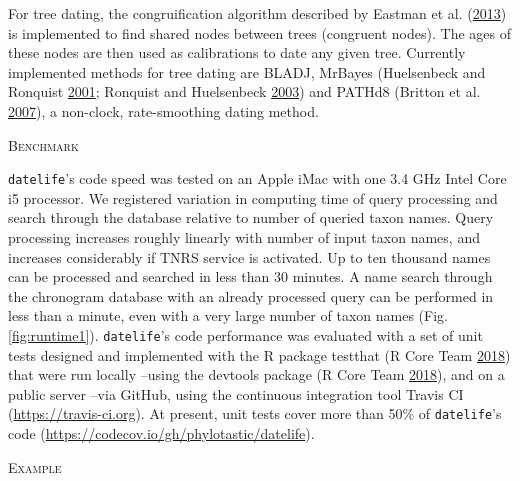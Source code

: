 \documentclass[]{article}
\begin{document}
For tree dating, the congruification algorithm described by Eastman et al. (\protect\hyperlink{ref-Eastman2013}{2013})
is implemented to find shared nodes between trees (congruent nodes). The ages of these nodes are then used as calibrations to date any given tree. Currently implemented methods for tree dating are BLADJ, MrBayes (Huelsenbeck and Ronquist \protect\hyperlink{ref-Huelsenbeck2001}{2001}; Ronquist and Huelsenbeck \protect\hyperlink{ref-Ronquist2003}{2003}) and PATHd8 (Britton et al. \protect\hyperlink{ref-Britton2007}{2007}), a non-clock, rate-smoothing dating method.

\begin{center}
\textsc{Benchmark}
\end{center}

\texttt{datelife}'s code speed was tested on an Apple iMac
with one 3.4 GHz Intel Core i5 processor.
We registered variation in computing time of query processing and search through the database relative to number of queried taxon names.
Query processing increases roughly linearly with number of input taxon names, and
increases considerably if TNRS service is activated. Up to ten thousand names can be processed and searched in less than 30 minutes. A name search through the chronogram database with an already processed query can be performed in less than a minute, even with a very large number of taxon names (Fig. \ref{fig:runtime1}).
\texttt{datelife}'s code performance was evaluated with a set of unit tests designed and
implemented with the R package testthat (R Core Team \protect\hyperlink{ref-RCoreTeam2018}{2018}) that were run locally
--using the devtools package (R Core Team \protect\hyperlink{ref-RCoreTeam2018}{2018}), and on a public server --via
GitHub, using the continuous integration tool Travis CI (\url{https://travis-ci.org}). At
present, unit tests cover more than 50\% of \texttt{datelife}'s code (\url{https://codecov.io/gh/phylotastic/datelife}).

\begin{center}
\textsc{Example}
\end{center}
\end{document}
